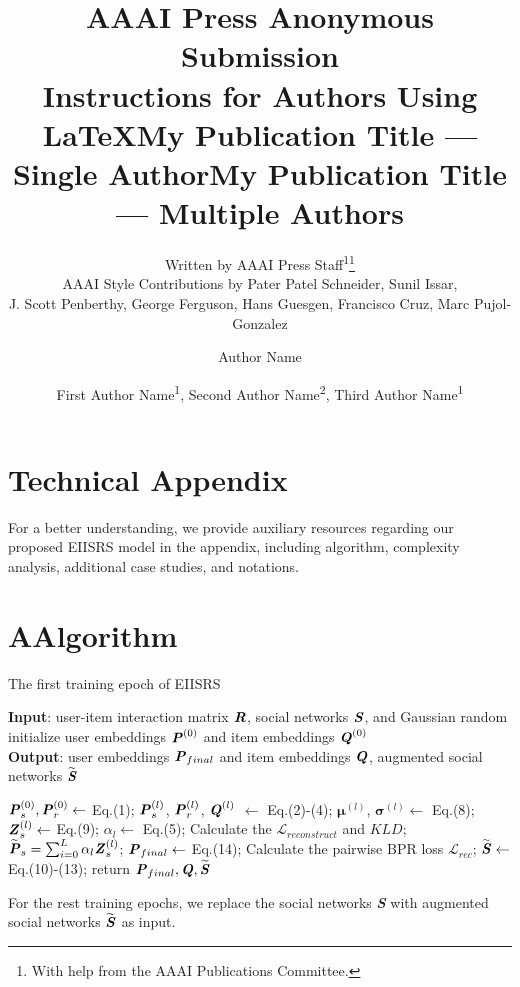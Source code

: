 \documentclass[letterpaper]{article} %
\title{AAAI Press Anonymous Submission\\Instructions for Authors Using \LaTeX{}}
\author{
    Written by AAAI Press Staff\textsuperscript{\rm 1}\thanks{With help from the AAAI Publications Committee.}\\
    AAAI Style Contributions by Pater Patel Schneider,
    Sunil Issar,\\
    J. Scott Penberthy,
    George Ferguson,
    Hans Guesgen,
    Francisco Cruz\equalcontrib,
    Marc Pujol-Gonzalez\equalcontrib
}
\title{My Publication Title --- Single Author}
\author {
    Author Name
}
\title{My Publication Title --- Multiple Authors}
\author {
    First Author Name\textsuperscript{\rm 1},
    Second Author Name\textsuperscript{\rm 2},
    Third Author Name\textsuperscript{\rm 1}
}
\begin{document}
\section{Technical Appendix}
For a better understanding, we provide auxiliary resources regarding our proposed EIISRS model in the appendix, including algorithm, complexity analysis, additional case studies, and notations.
\section{A{\quad}Algorithm}
\begin{algorithm}[h]
    \caption{The first training epoch of EIISRS}
    \label{alg:algorithm}
    \textbf{Input}: user-item interaction matrix $\textbf{\textit{R}}$, social networks $\textbf{\textit{S}}$, and Gaussian random initialize user embeddings $\textbf{\textit{P}}^{(0)}$ and item embeddings $\textbf{\textit{Q}}^{(0)}$\\
    \textbf{Output}: user embeddings $\textbf{\textit{P}}_{final}$ and item embeddings $\textbf{\textit{Q}}$, augmented social networks $\widetilde{\textbf{\textit{S}}}$
    \begin{algorithmic}[1]
                \State $\textbf{\textit{P}}^{(0)}_s, \textbf{\textit{P}}^{(0)}_r \gets$ Eq.(1); \textcolor{RoyalBlue}{\small{}}
                    \State $\textbf{\textit{P}}^{(l)}_s$, $\textbf{\textit{P}}^{(l)}_r$, $\textbf{\textit{Q}}^{(l)}$ $\gets$ Eq.(2)-(4);\textcolor{RoyalBlue}{\small{}}
                    \State $\boldsymbol{\mu}^{(l)}$, $\boldsymbol{\sigma}^{(l)} \gets$ Eq.(8);
                    \State $\textbf{\textit{Z}}_s^{(l)} \gets$ Eq.(9); \textcolor{RoyalBlue}{\small{}}
                    \State ${\alpha}_l \gets$ Eq.(5);
                    \State Calculate the $\mathcal{L}_{reconstruct}$ and $KLD$;
                \EndFor
                \State $\widetilde{\textbf{\textit{P}}}_s = \sum_{i=0}^{L}\alpha_l\textbf{\textit{Z}}_s^{(l)}$; \textcolor{RoyalBlue}{\small{}}
                \State $\textbf{\textit{P}}_{final} \gets$ Eq.(14);
                \State Calculate the pairwise BPR loss $\mathcal{L}_{rec}$;
            \EndFor
            \State $\widetilde{\textbf{\textit{S}}} \gets$ Eq.(10)-(13); \textcolor{RoyalBlue}{\small{}}
        \EndFor
        \State return $\textbf{\textit{P}}_{final}, \textbf{\textit{Q}}, \widetilde{\textbf{\textit{S}}}$
    \end{algorithmic}
\end{algorithm}
For the rest training epochs, we replace the social networks \textbf{\textit{S}} with augmented social networks $\widetilde{\textbf{\textit{S}}}$ as input.
\end{document}
